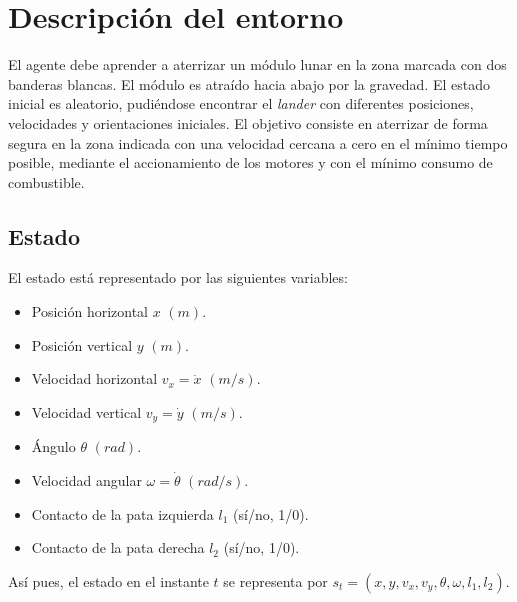 \documentclass{article}
\begin{document}
  





\section{Descripción del entorno}
El agente debe aprender a aterrizar un módulo lunar en la zona marcada con dos banderas blancas. El módulo es atraído hacia abajo por la gravedad. El estado inicial es aleatorio, pudiéndose encontrar el \textit{lander} con diferentes posiciones, velocidades y orientaciones iniciales. El objetivo consiste en aterrizar de forma segura en la zona indicada con una velocidad cercana a cero en el mínimo tiempo posible, mediante el accionamiento de los motores y con el mínimo consumo de combustible.

\subsection{Estado}
El estado está representado por las siguientes variables:
\begin{itemize}
    \item[1.] Posición horizontal $x$ $(m)$.
  \item[2.] Posición vertical $y$ $(m)$.
  \item[3.] Velocidad horizontal $v_x=\dot{x}$ $(m/s)$.
  \item[4.] Velocidad vertical $v_y=\dot{y}$ $(m/s)$.
  \item[5.] Ángulo $\theta$ $(rad)$.
  \item[6.] Velocidad angular $\omega=\dot{\theta}$ $(rad/s)$.
  \item[7.] Contacto de la pata izquierda $l_1$ (sí/no, 1/0).
  \item[8.] Contacto de la pata derecha $l_2$ (sí/no, 1/0).
\end{itemize}

Así pues, el estado en el instante $t$ se representa por $s_t=(x, y, v_x, v_y, \theta, \omega, l_1, l_2)$.
\end{document}
